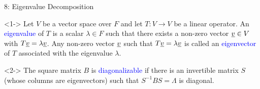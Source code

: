 \documentclass[10pt,english,aspectratio=169]{beamer}
\begin{document}
\begin{frame}{8: Eigenvalue Decomposition}

\begin{definition}<1->
Let $V$ be a vector space over $F$ and let $T\colon V \to V$ be a linear operator.
An \textcolor{blue}{eigenvalue} of $T$ is a scalar $\lambda \in F$ such that there exists a non-zero vector $\underline{v} \in V$ with $T \underline{v} = \lambda \underline{v}$.
Any non-zero vector $\underline{v}$ such that $T \underline{v} = \lambda \underline{v}$ is called an \textcolor{blue}{eigenvector} of $T$ associated with the eigenvalue $\lambda$.
\end{definition}

\begin{definition}<2->
The square matrix $B$ is \textcolor{blue}{diagonalizable} if there is an invertible matrix $S$ (whose columns are eigenvectors) such that $S^{-1} B S = \Lambda$ is diagonal.
\end{definition}




\end{frame}
\end{document}
